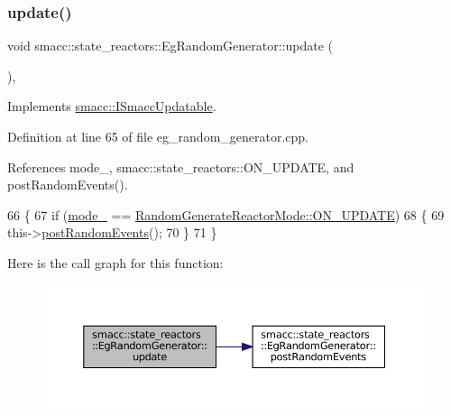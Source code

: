 \mbox{\label{classsmacc_1_1state__reactors_1_1EgRandomGenerator_a0d442604ba19606ab12a384ee3998b49}} 
\subsubsection{\texorpdfstring{update()}{update()}}
{\footnotesize\ttfamily void smacc\+::state\+\_\+reactors\+::\+Eg\+Random\+Generator\+::update (\begin{DoxyParamCaption}{ }\end{DoxyParamCaption})\hspace{0.3cm}{\ttfamily [override]}, {\ttfamily [virtual]}}



Implements \hyperlink{classsmacc_1_1ISmaccUpdatable_a84ee0520cbefdb1d412bed54650b028e}{smacc\+::\+I\+Smacc\+Updatable}.



Definition at line 65 of file eg\+\_\+random\+\_\+generator.\+cpp.



References mode\+\_\+, smacc\+::state\+\_\+reactors\+::\+O\+N\+\_\+\+U\+P\+D\+A\+TE, and post\+Random\+Events().


\begin{DoxyCode}
66         \{
67             \textcolor{keywordflow}{if} (\hyperlink{classsmacc_1_1state__reactors_1_1EgRandomGenerator_a73448940ff292ccc365a68bb39eecdf7}{mode\_} == \hyperlink{namespacesmacc_1_1state__reactors_a038f8e362ad6d35494c940ee4c97a52ea4a6be4c8602d150038b100a35556d3d7}{RandomGenerateReactorMode::ON\_UPDATE})
68             \{
69                 this->\hyperlink{classsmacc_1_1state__reactors_1_1EgRandomGenerator_ab570c2d1a3e70adb8cfacfcd9000715e}{postRandomEvents}();
70             \}
71         \}
\end{DoxyCode}
Here is the call graph for this function\+:
\nopagebreak
\begin{figure}[H]
\begin{center}
\leavevmode
\includegraphics[width=350pt]{classsmacc_1_1state__reactors_1_1EgRandomGenerator_a0d442604ba19606ab12a384ee3998b49_cgraph}
\end{center}
\end{figure}


